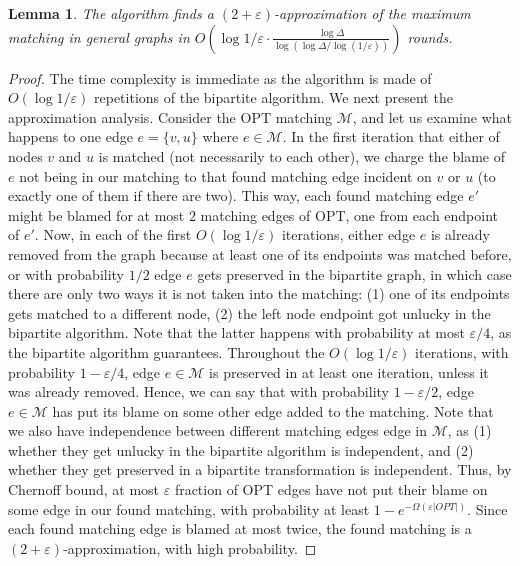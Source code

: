 \documentclass[11pt]{article}
\newtheorem{lemma}[theorem]{Lemma}
\newcommand{\eps}{\varepsilon}
\begin{document}
\begin{lemma} The algorithm finds a $(2+\eps)$-approximation of the maximum matching in general graphs in $O(\log 1/\eps \cdot \frac{\log \Delta}{\log(\log \Delta/\log(1/\eps))})$ rounds.
\end{lemma}
\begin{proof}
The time complexity is immediate as the algorithm is made of $O(\log 1/\eps)$ repetitions of the bipartite algorithm. We next present the approximation analysis.
Consider the OPT matching $\mathcal{M}$, and let us examine what happens to one edge $e=\{v, u\}$ where $e \in\mathcal{M}$. In the first iteration that either of nodes $v$ and $u$ is matched (not necessarily to each other), we charge the blame of $e$ not being in our matching to that found matching edge incident on $v$ or $u$ (to exactly one of them if there are two). This way, each found matching edge $e'$ might be blamed for at most $2$ matching edges of OPT, one from each endpoint of $e'$. Now, in each of the first $O(\log 1/\eps)$ iterations, either edge $e$ is already removed from the graph because at least one of its endpoints was matched before, or with probability $1/2$ edge $e$ gets preserved in the bipartite graph, in which case there are only two ways it is not taken into the matching: (1) one of its endpoints gets matched to a different node, (2) the left node endpoint got unlucky in the bipartite algorithm. Note that the latter happens with probability at most $\eps/4$, as the bipartite algorithm guarantees. Throughout the $O(\log 1/\eps)$ iterations, with probability $1-\eps/4$, edge $e\in \mathcal{M}$ is preserved in at least one iteration, unless it was already removed. Hence, we can say that with probability $1-\eps/2$, edge $e \in \mathcal{M}$ has put its blame on some other edge added to the matching. Note that we also have independence between different matching edges edge in $\mathcal{M}$, as (1) whether they get unlucky in the bipartite algorithm is independent, and (2) whether they get preserved in a bipartite transformation is independent. Thus, by Chernoff bound, at most $\eps$ fraction of OPT edges have not put their blame on some edge in our found matching, with probability at least $1-e^{-\Omega(\eps|OPT|)}$. Since each found matching edge is blamed at most twice, the found matching is a $(2+\eps)$-approximation, with high probability.
\end{proof}
\end{document}
